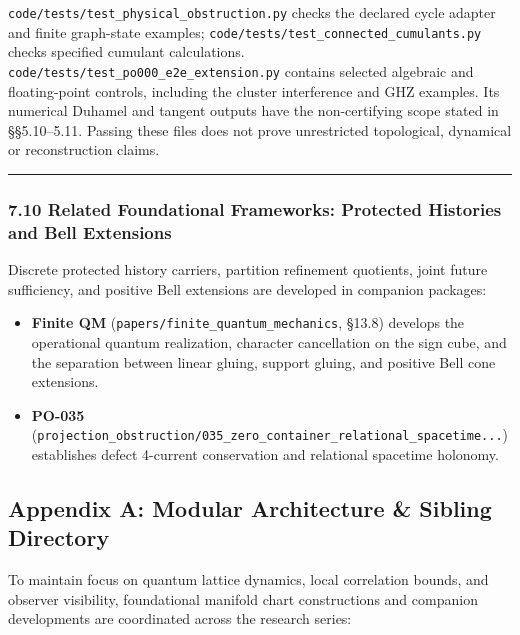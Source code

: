\documentclass[
  11pt,
]{article}
\providecommand{\tightlist}{%
  \setlength{\itemsep}{0pt}\setlength{\parskip}{0pt}}
\providecommand{\tightlist}{%
  \setlength{\itemsep}{0pt}\setlength{\parskip}{0pt}}
\begin{document}
\texttt{code/tests/test\_physical\_obstruction.py} checks the declared cycle adapter
and finite graph-state examples; \texttt{code/tests/test\_connected\_cumulants.py}
checks specified cumulant calculations. \texttt{code/tests/test\_po000\_e2e\_extension.py}
contains selected algebraic and floating-point controls, including the
cluster interference and GHZ examples. Its numerical Duhamel and tangent
outputs have the non-certifying scope stated in §§5.10--5.11. Passing these
files does not prove unrestricted topological, dynamical or reconstruction
claims.

\begin{center}\rule{0.5\linewidth}{0.5pt}\end{center}

\subsubsection{7.10 Related Foundational Frameworks: Protected Histories and Bell Extensions}\label{related-foundational-frameworks-protected-histories-and-bell-extensions}

Discrete protected history carriers, partition refinement quotients, joint future sufficiency, and positive Bell extensions are developed in companion packages:

\begin{itemize}
\tightlist
\item
  \textbf{Finite QM} (\texttt{papers/finite\_quantum\_mechanics}, §13.8) develops the operational quantum realization, character cancellation on the sign cube, and the separation between linear gluing, support gluing, and positive Bell cone extensions.
\item
  \textbf{PO-035} (\texttt{projection\_obstruction/035\_zero\_container\_relational\_spacetime...}) establishes defect 4-current conservation and relational spacetime holonomy.
\end{itemize}

\subsection{Appendix A: Modular Architecture \& Sibling Directory}\label{appendix-a-modular-architecture-sibling-directory}

To maintain focus on quantum lattice dynamics, local correlation bounds, and observer visibility, foundational manifold chart constructions and companion developments are coordinated across the research series:
\end{document}
